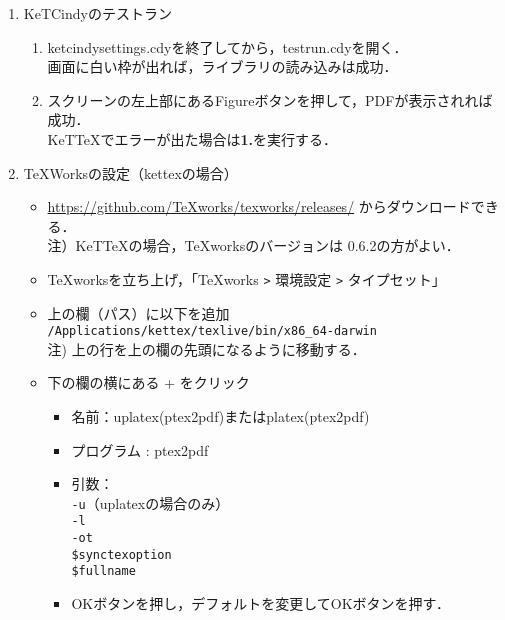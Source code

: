 \documentclass{ujarticle}
\begin{document}
\begin{enumerate}[\bf\large 1.]
  \item KeTCindyのテストラン
    \begin{enumerate}[(1)]
    \item ketcindysettings.cdyを終了してから，testrun.cdyを開く．\\
      \hspace*{10mm}画面に白い枠が出れば，ライブラリの読み込みは成功．
    \item スクリーンの左上部にあるFigureボタンを押して，PDFが表示されれば成功．\\
\hspace*{10mm}KeTTeXでエラーが出た場合は{\bf 1.}を実行する．
\end{enumerate}

\item TeXWorksの設定（kettexの場合）
  \begin{itemize}
  \item \url{https://github.com/TeXworks/texworks/releases/} からダウンロードできる．\\
\hspace*{10mm}注）KeTTeXの場合，TeXworksのバージョンは 0.6.2の方がよい．
  \item TeXworksを立ち上げ，「TeXworks \verb|>| 環境設定 \verb|>| タイプセット」
  \item 上の欄（パス）に以下を追加\\
  \hspace*{5mm}\verb|/Applications/kettex/texlive/bin/x86_64-darwin|\\
  \hspace*{10mm}注) 上の行を上の欄の先頭になるように移動する．
  \item 下の欄の横にある + をクリック
    \begin{itemize}
    \item 名前：uplatex(ptex2pdf)またはplatex(ptex2pdf)
    \item プログラム : ptex2pdf
    \item 引数：\\
    \hspace*{10mm} \verb|-u|（uplatexの場合のみ）\\
    \hspace*{10mm} \verb|-l|\\
    \hspace*{10mm} \verb|-ot|\\
    \hspace*{10mm}  \verb|$synctexoption|\\
    \hspace*{10mm}  \verb|$fullname|
    \item[]OKボタンを押し，デフォルトを変更してOKボタンを押す．
    \end{itemize}
  \end{itemize}


\end{enumerate}
\end{document}
